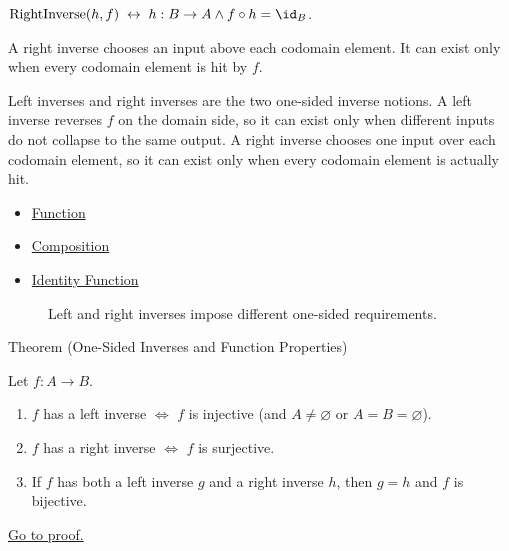\begin{remark*}
$\operatorname{RightInverse}(h,f)\;\leftrightarrow\; h:B\to A \wedge
f\circ h=\id_B$.
\end{remark*}

\begin{remark*}[Interpretation]
A right inverse chooses an input above each codomain element. It can exist only
when every codomain element is hit by $f$.
\end{remark*}

\begin{remark*}[Exposition]
Left inverses and right inverses are the two one-sided inverse notions.
A left inverse reverses $f$ on the domain side, so it can exist only when
different inputs do not collapse to the same output. A right inverse chooses
one input over each codomain element, so it can exist only when every codomain
element is actually hit.
\end{remark*}

\begin{dependencies}
\begin{itemize}
  \item \hyperref[def:function]{Function}
  \item \hyperref[def:composition]{Composition}
  \item \hyperref[def:identity]{Identity Function}
\end{itemize}
\end{dependencies}

\begin{figure}[htbp]
\centering

\caption{Left and right inverses impose different one-sided requirements.}
\label{fig:one-sided-inverses}
\end{figure}

\begin{theorembox}{Theorem (One-Sided Inverses and Function Properties)}
\begin{theorem}\label{thm:one-sided}
Let $f : A \to B$.
\begin{enumerate}[label=(\roman*)]
\item $f$ has a left inverse $\iff$ $f$ is injective (and $A \neq \varnothing$ or $A=B=\varnothing$).
\item $f$ has a right inverse $\iff$ $f$ is surjective.
\item If $f$ has both a left inverse $g$ and a right inverse $h$, then $g = h$
and $f$ is bijective.
\end{enumerate}
\hyperref[prf:one-sided]{Go to proof.}
\end{theorem}
\end{theorembox}

